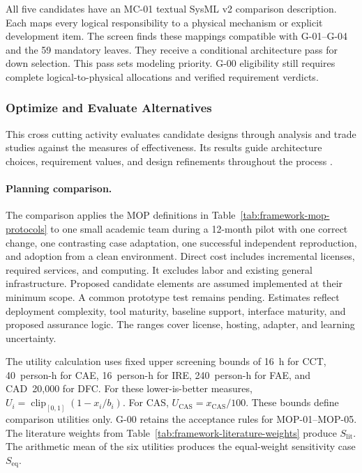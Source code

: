 \documentclass[11pt,a4paper]{article}
\begin{document}
All five candidates have an MC-01 textual SysML v2 comparison description. Each maps every logical responsibility to a physical mechanism or explicit development item. The screen finds these mappings compatible with G-01--G-04 and the 59 mandatory leaves. They receive a conditional architecture pass for down selection. This pass sets modeling priority. G-00 eligibility still requires complete logical-to-physical allocations and verified requirement verdicts.

\subsubsection{Optimize and Evaluate Alternatives}
This cross cutting activity evaluates candidate designs through analysis and trade studies against the measures of effectiveness. Its results guide architecture choices, requirement values, and design refinements throughout the process \citep[Sec.~17.3.6]{friedenthal2014practical}.

\paragraph{Planning comparison.}
The comparison applies the MOP definitions in Table~\ref{tab:framework-mop-protocols} to one small academic team during a 12-month pilot with one correct change, one contrasting case adaptation, one successful independent reproduction, and adoption from a clean environment. Direct cost includes incremental licenses, required services, and computing. It excludes labor and existing general infrastructure. Proposed candidate elements are assumed implemented at their minimum scope. A common prototype test remains pending. Estimates reflect deployment complexity, tool maturity, baseline support, interface maturity, and proposed assurance logic. The ranges cover license, hosting, adapter, and learning uncertainty.

The utility calculation uses fixed upper screening bounds of 16~h for CCT, 40~person-h for CAE, 16~person-h for IRE, 240~person-h for FAE, and CAD~20,000 for DFC. For these lower-is-better measures, $U_i=\operatorname{clip}_{[0,1]}(1-x_i/b_i)$. For CAS, $U_{\mathrm{CAS}}=x_{\mathrm{CAS}}/100$. These bounds define comparison utilities only. G-00 retains the acceptance rules for MOP-01--MOP-05. The literature weights from Table~\ref{tab:framework-literature-weights} produce $S_{\mathrm{lit}}$. The arithmetic mean of the six utilities produces the equal-weight sensitivity case $S_{\mathrm{eq}}$.
\end{document}
